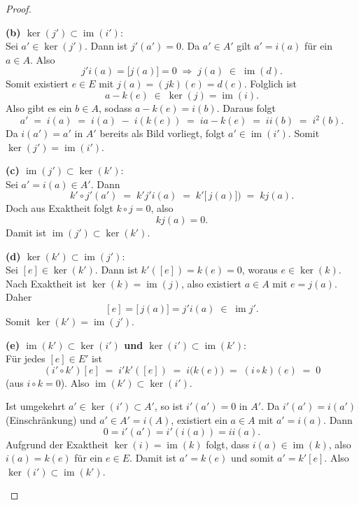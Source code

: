 \documentclass[12pt]{article}
\numberwithin{conj}{section}
\newcommand{\ima}{\operatorname{im}}
\begin{document}
\begin{proof}
\begin{enumerate}[nolistsep]
                \textbf{(b) $\ker(j') \subset \ima(i')$}:\\ Sei $a' \in \ker(j')$. Dann
                ist $j'(a') = 0$. Da $a' \in A'$ gilt $a' = i(a)$ für ein $a \in A$.
                Also
                \[
                    j' i(a)  = \bigl[j(a)\bigr] = 0 \;\Longrightarrow\; j(a) \;\in
                    \; \ima(d).
                \]
                Somit existiert $e \in E$ mit $j(a) = (jk)(e) = d(e)$. Folglich ist
                \[
                    a - k(e) \;\in\; \ker(j) = \ima(i).
                \]
                Also gibt es ein $b \in A$, sodass $a - k(e) = i(b)$. Daraus folgt
                \[
                    a' \;=\; i(a) \;=\; i(a) \;-\; i(k(e)) \;=\; i a - k(e)  \;=\;
                    i i(b)  \;=\; i^{2}(b).
                \]
                Da $i(a') = a'$ in $A'$ bereits als Bild vorliegt, folgt
                $a' \in \ima(i')$. Somit $\ker(j') = \ima(i')$.

                \textbf{(c) $\ima(j') \subset \ker(k')$}:\\ Sei $a' = i(a) \in A'$. Dann
                \[
                     k' \circ j' (a') \;=\; k' j' i(a)   \;=\;
                    k' [\,j(a)\bigr]) \;=\; k j(a) .
                \]
                Doch aus Exaktheit folgt $k \circ j = 0$, also
                \[
                    k j(a)  = 0.
                \]
                Damit ist $\ima(j') \subset \ker(k')$.

                \textbf{(d) $\ker(k') \subset \ima(j')$}:\\ Sei $[e] \in \ker(k')$. Dann
                ist $k'( [e] ) = k(e) = 0$, woraus $e \in \ker(k)$. Nach Exaktheit ist
                $\ker(k) = \ima(j)$, also existiert $a \in A$ mit $e = j(a)$. Daher
                \[
                    [e] = [\,j(a)\bigr] = j' i(a)  \;\in\; \ima j' .
                \]
                Somit $\ker(k') = \ima(j')$.

                \textbf{(e) $\ima(k') \subset \ker(i')$ und $\ker(i') \subset \ima(k')$}:\\
                Für jedes $[e] \in E'$ ist
                \[
                    (i' \circ k') [e]  \;=\; i' k'( [e] )  \;=\; i\bigl
                    (k(e)\bigr)  \;=\; (i \circ k)(e) \;=\; 0
                \]
                (aus $i \circ k = 0$). Also $\ima(k') \subset \ker(i')$.

                Ist umgekehrt $a' \in \ker(i') \subset A'$, so ist $i'(a') = 0$ in $A'$.
                Da $i'(a') = i(a')$ (Einschränkung) und $a' \in A' = i(A)$, existiert ein
                $a \in A$ mit $a' = i(a)$. Dann
                \[
                    0 = i'(a') = i'(i(a)) = i i(a) .
                \]
                Aufgrund der Exaktheit $\ker(i) = \ima(k)$ folgt, dass $i(a) \in \ima(k)$,
                also $i(a) = k(e)$ für ein $e \in E$. Damit ist $a' = k(e)$ und somit $a'
                = k' [e] $. Also $\ker(i') \subset \ima(k')$.


\end{enumerate}
\end{proof}
\end{document}
